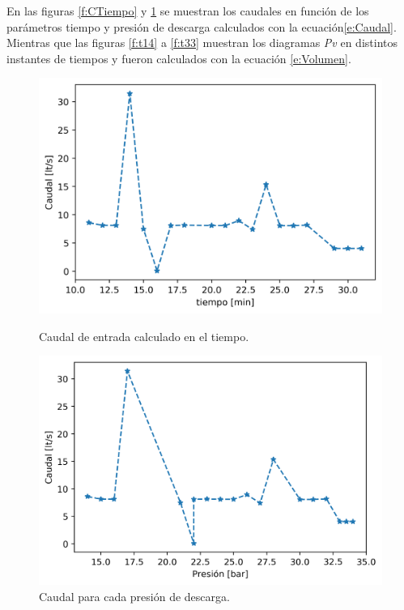 \documentclass[11pt,letterpaper]{extarticle}        %
\numberwithin{equation}{section}                    %
\begin{document}
En las figuras \ref{f:CTiempo} y \ref{f:CPresion} se muestran los caudales en función de los parámetros tiempo y presión de descarga calculados con la ecuación\ref{e:Caudal}. Mientras que las figuras \ref{f:t14} a \ref{f:t33} muestran los diagramas \textit{Pv} en distintos instantes de tiempos y fueron calculados con la ecuación \ref{e:Volumen}.

\begin{figure}[H]
\begin{minipage}{0.5\linewidth}
\centering
\includegraphics[width = \linewidth]{CaudalTiempo}
\caption{Caudal de entrada calculado en el tiempo.}
\label{f:CTiempo}
\end{minipage}
\begin{minipage}{0.5\linewidth}
\centering
\includegraphics[width = \linewidth]{CaudalPresion}
\caption{Caudal para cada presión de descarga.}
\label{f:CPresion}
\end{minipage}
\end{figure}
\end{document}
